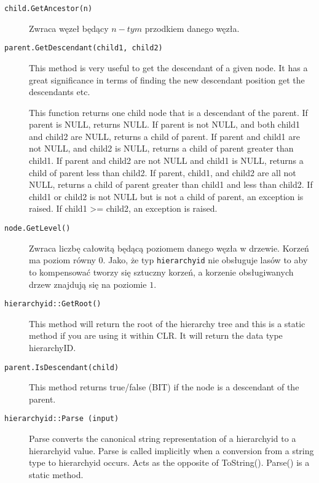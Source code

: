 \begin{description}
  \item[\texttt{child.GetAncestor(n)}]
    Zwraca węzeł będący  $n-tym$ przodkiem danego węzła.

  \item[\texttt{parent.GetDescendant(child1, child2)}]
	This method is very useful to get the descendant of a given node. 
	It has a great significance in terms of finding the new descendant position get the descendants etc. 

	This function returns one child node that is a descendant of the parent. 
	If parent is NULL, returns NULL. 
	If parent is not NULL, and both child1 and child2 are NULL, returns a child of parent. 
	If parent and child1 are not NULL, and child2 is NULL, returns a child of parent greater than child1. 
	If parent and child2 are not NULL and child1 is NULL, returns a child of parent less than child2. 
	If parent, child1, and child2 are all not NULL, returns a child of parent greater than child1 and less than child2. 
	If child1 or child2 is not NULL but is not a child of parent, an exception is raised. 
	If child1 >= child2, an exception is raised.

  \item[\texttt{node.GetLevel()}]
	Zwraca liczbę całowitą będącą poziomem danego węzła w drzewie. 
	Korzeń ma poziom równy $0$. 
	Jako, że typ \texttt{hierarchyid} nie obsługuje lasów to aby to kompensować tworzy się sztuczny korzeń, a korzenie obsługiwanych drzew znajdują się na poziomie $1$.


  \item[\texttt{hierarchyid::GetRoot()}]
	This method will return the root of the hierarchy tree and this is a static method if you are using it within CLR. 
	It will return the data type hierarchyID. 

  \item[\texttt{parent.IsDescendant(child)}]
	This method returns true/false (BIT) if the node is a descendant of the parent. 

  \item[\texttt{hierarchyid::Parse (input)}]
	Parse converts the canonical string representation of a hierarchyid to a hierarchyid value. 
	Parse is called implicitly when a conversion from a string type to hierarchyid occurs. 
	Acts as the opposite of ToString(). 
	Parse() is a static method. 


\end{description}
